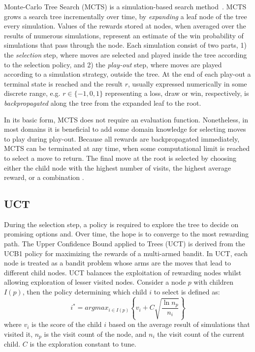 \documentclass{ecai2014}
\begin{document}
Monte-Carlo Tree Search (MCTS) is a simulation-based search method~\cite{coulom2007efficient,kocsis2006bandit}. MCTS grows a search tree incrementally over time, by \emph{expanding} a leaf node of the tree every simulation. Values of the rewards stored at nodes, when averaged over the results of numerous simulations, represent an estimate of the win probability of simulations that pass through the node. 
Each simulation consist of two parts, 1) the \emph{selection} step, where moves are selected and played inside the tree according to the selection policy, and 2) the \emph{play-out} step, where moves are played according to a simulation strategy, outside the tree. At the end of each play-out a terminal state is reached and the result $r$, usually expressed numerically in some discrete range, e.g. $r \in \{-1, 0, 1\}$ representing a loss, draw or win, respectively, is \emph{backpropagated} along the tree from the expanded leaf to the root. 

In its basic form, MCTS does not require an evaluation function. Nonetheless, in most domains it is beneficial to add some domain knowledge for selecting moves to play during play-out. Because all rewards are backpropagated immediately, MCTS can be terminated at any time, when some computational limit is reached to select a move to return. The final move at the root is selected by choosing either the child node with the highest number of visits, the highest average reward, or a combination \cite{chaslot2008progressive}. 

\subsection{UCT}
\label{subsec:uct}
During the selection step, a policy is required to explore the tree to decide on promising options and. Over time, the hope is to converge to the most rewarding path. The Upper Confidence Bound applied to Trees (UCT) \cite{kocsis2006bandit} is derived from the UCB1 policy \cite{auer2002using} for maximizing the rewards of a multi-armed bandit. In UCT, each node is treated as a bandit problem whose arms are the moves that lead to different child nodes. UCT balances the exploitation of rewarding nodes whilst allowing exploration of lesser visited nodes. Consider a node $p$ with children $I(p)$, then the policy determining which child $i$ to select is defined as:
\begin{equation}
\label{eq:uct}
i^* = argmax_{i \in I(p)}\left\{ v_i + C \sqrt{ \frac{\ln{n_p}}{n_i}}\right\}
\end{equation}
where $v_i$ is the score of the child $i$ based on the average result of simulations that visited it, $n_p$ is the visit count of the node, and $n_i$ the visit count of the current child. $C$ is the exploration constant to tune. 
\end{document}
